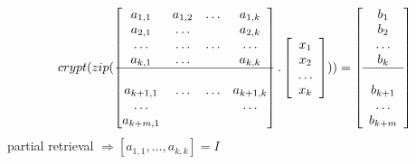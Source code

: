 \documentclass{beamer}
\begin{document}
\begin{frame}
\begin{equation*}
 crypt(zip(
     \begin{bmatrix}
     a_{1,1}  & a_{1,2}   & \ldots & a_{1,k} \\
     a_{2,1}  & \ldots    &        & a_{2,k} \\
     \ldots   & \ldots    & \ldots & \ldots  \\
     a_{k,1}  &  \ldots   &        & a_{k,k} \\
     \hline\\
     a_{k+1,1}& \ldots    & \ldots & a_{k+1,k} \\
     \ldots   &           &        & \ldots  \\
     a_{k+m,1}&           &        &
     \end{bmatrix} .
     \left[\begin{array}{c}x_{1}\\ x_{2}\\ \ldots \\ x_{k} \end{array}\right])
  )
 =
 \left[\begin{array}{c}
     b_{1} \\ b_{2} \\ \ldots \\ b_{k} \\
     \hline \\
     b_{k+1} \\ \ldots \\ b_{k+m} \end{array}
 \right]
\end{equation*}
partial retrieval $ \Rightarrow [a_{1,1},\ldots, a_{k,k}] = I$
\end{frame}
\end{document}
